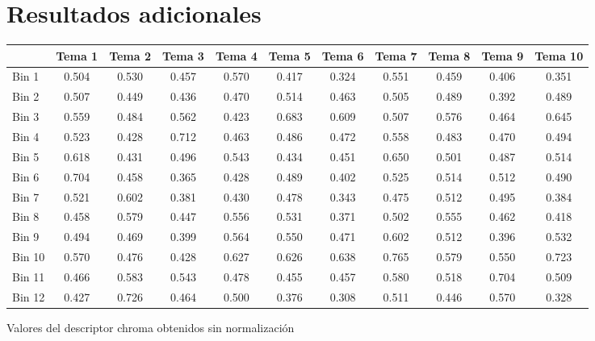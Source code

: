 \documentclass[]{article}
\makeatletter
\newcommand{\tabla}[4]{
\begin{tablehere}
\begin{center}
\begin{tabular}{#1}
#2
\end{tabular}
\caption{#3}
\label{#4}
\end{center}
\end{tablehere}
}
\newenvironment{tablehere}    %
  {\def\@captype{table}}    %

  {}              %
\makeatother
\begin{document}
\section{Resultados adicionales}
\label{anexo: chroma}
\tabla
{|l|c|c|c|c|c|c|c|c|c|c|}
{
\hline
 &Tema 1 & Tema 2 & Tema 3 & Tema 4 & Tema 5 & Tema 6 & Tema 7 & Tema 8 & Tema 9 & Tema 10 \\
\hline
Bin 1 & 0.504 & 0.530 & 0.457 & 0.570 & 0.417 & 0.324 & 0.551 & 0.459 & 0.406 & 0.351 \\
\hline
Bin 2 & 0.507 & 0.449 & 0.436 & 0.470 & 0.514 & 0.463 & 0.505 & 0.489 & 0.392 & 0.489 \\
\hline
Bin 3 & 0.559 & 0.484 & 0.562 & 0.423 & 0.683 & 0.609 & 0.507 & 0.576 & 0.464 & 0.645 \\
\hline
Bin 4 & 0.523 & 0.428 & 0.712 & 0.463 & 0.486 & 0.472 & 0.558 & 0.483 & 0.470 & 0.494 \\
\hline
Bin 5 & 0.618 & 0.431 & 0.496 & 0.543 & 0.434 & 0.451 & 0.650 & 0.501 & 0.487 & 0.514 \\
\hline
Bin 6 & 0.704 & 0.458 & 0.365 & 0.428 & 0.489 & 0.402 & 0.525 & 0.514 & 0.512 & 0.490 \\
\hline
Bin 7 & 0.521 & 0.602 & 0.381 & 0.430 & 0.478 & 0.343 & 0.475 & 0.512 & 0.495 & 0.384 \\
\hline
Bin 8 & 0.458 & 0.579 & 0.447 & 0.556 & 0.531 & 0.371 & 0.502 & 0.555 & 0.462 & 0.418 \\
\hline
Bin 9 & 0.494 & 0.469 & 0.399 & 0.564 & 0.550 & 0.471 & 0.602 & 0.512 & 0.396 & 0.532 \\
\hline
Bin 10 & 0.570 & 0.476 & 0.428 & 0.627 & 0.626 & 0.638 & 0.765 & 0.579 & 0.550 & 0.723 \\
\hline
Bin 11 & 0.466 & 0.583 & 0.543 & 0.478 & 0.455 & 0.457 & 0.580 & 0.518 & 0.704 & 0.509 \\
\hline
Bin 12 & 0.427 & 0.726 & 0.464 & 0.500 & 0.376 & 0.308 & 0.511 & 0.446 & 0.570 & 0.328 \\
\hline
}
{Valores del descriptor chroma obtenidos sin normalización}
{tab: chroma}
\end{document}
